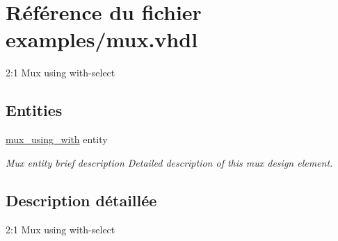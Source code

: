 \hypertarget{mux_8vhdl}{}\section{Référence du fichier examples/mux.vhdl}
\label{mux_8vhdl}


2\+:1 Mux using with-\/select  


\subsection*{Entities}
\begin{DoxyCompactItemize}
\item 
\hyperlink{classmux__using__with}{mux\+\_\+using\+\_\+with} entity
\begin{DoxyCompactList}\small\item\em Mux entity brief description Detailed description of this mux design element. \end{DoxyCompactList}\end{DoxyCompactItemize}


\subsection{Description détaillée}
2\+:1 Mux using with-\/select 

